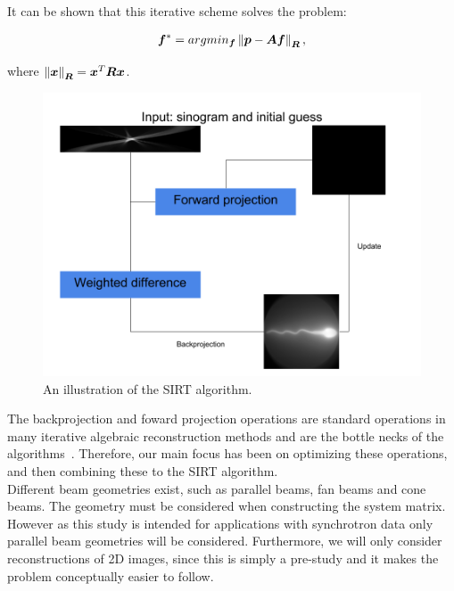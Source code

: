 It can be shown that this iterative scheme solves the problem:

\begin{align}
 \vec{f}^{\ast}=argmin_{\vec{f}}\norm{\vec{p}-\mat{A}\vec{f}}_{\mat{R}},
\end{align}

where $\norm{\vec{x}}_{\mat{R}} = \vec{x}^T\mat{R}\vec{x}$.

\begin{figure}
\includegraphics[width=\linewidth]{images/sirt.png}
\caption{An illustration of the SIRT algorithm.}
\label{fig:sirt}
\end{figure}

The backprojection and foward projection operations are standard operations in many iterative algebraic reconstruction methods and are the bottle necks of the algorithms~\cite{footprints2010}. Therefore, our main focus has been on optimizing these operations, and then combining these to the SIRT algorithm.\\
Different beam geometries exist, such as parallel beams, fan beams and cone beams. The geometry must be considered when constructing the system matrix. However as this study is intended for applications with synchrotron data only parallel beam geometries will be considered. Furthermore, we will only consider reconstructions of 2D images, since this is simply a pre-study and it makes the problem conceptually easier to follow.\\
